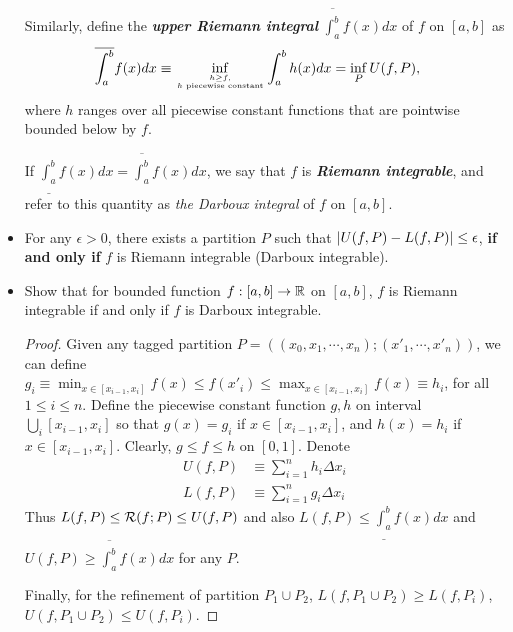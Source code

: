 \documentclass[11pt]{article}
\begin{document}
\begin{itemize}
\begin{definition}
Similarly, define the \emph{\textbf{upper Riemann integral}} $\overline{\int_{a}^{b}}f(x)dx$ of $f$ on $[a, b]$ as
\begin{align*}
\overline{\int_{a}^{b}}f(x)dx &\equiv \inf\limits_{h\ge f, \atop h \text{ piecewise constant}}\int_{a}^{b}h(x)dx = \inf_{P}U(f,P),
\end{align*}
where $h$ ranges over all piecewise constant functions that are pointwise bounded below by $f$.

If $\underline{\int_{a}^{b}}f(x)dx = \overline{\int_{a}^{b}}f(x)dx$, we say that $f$ is \emph{\textbf{Riemann integrable}}, and refer to this quantity as \emph{the Darboux integral} of $f$ on $[a, b]$.
\end{definition}

\item \begin{theorem}
 For any $\epsilon>0$, there exists a partition $P$ such that $\left\lvert U(f,P) - L(f,P)  \right\rvert \le \epsilon $, \textbf{if and only if} $f$ is Riemann integrable (Darboux integrable).
\end{theorem}

\item \begin{exercise}
 Show that for bounded function  $f: [a,b] \rightarrow {\mathbb R}$  on $[a,b]$, $f$ is Riemann integrable if and only if $f$ is Darboux integrable. 
 \end{exercise}
 \begin{proof} 
 Given any  tagged partition $P=  ((x_{0}, x_{1}, \cdots, x_{n}); (x'_{1}, \cdots, x'_{n}))$, we can define $g_{i}\equiv \min_{x\in [x_{i-1}, x_{i}]}f(x) \le f(x'_{i})\le \max_{x\in [x_{i-1}, x_{i}]}f(x)\equiv h_{i}$, for all $1\le i\le n$. Define the piecewise constant function $g, h$ on interval $\bigcup_{i}[x_{i-1}, x_{i}]$ so that $g(x) = g_{i}$ if $x\in  [x_{i-1}, x_{i}]$, and $h(x) = h_{i}$ if $x\in  [x_{i-1}, x_{i}]$. Clearly, $g \le f \le h$ on $[0,1]$. Denote
 \begin{align*}
 U(f,P)&\equiv \sum_{i=1}^{n}h_{i}\Delta x_{i} \\
 L(f,P)&\equiv \sum_{i=1}^{n}g_{i}\Delta x_{i}
 \end{align*}
 Thus $L(f,P)\le {\mathcal R}(f ; P) \le U(f,P)$ and also $L(f,P)\le  \underline{\int_{a}^{b}}f(x)dx$ and $U(f,P)\ge \overline{\int_{a}^{b}}f(x)dx$ for any $P$.  
 
  Finally, for the refinement of partition $P_{1}\cup P_{2}$, $L(f, P_{1}\cup P_{2})\ge L(f,P_{i}) $, $U(f, P_{1}\cup P_{2})\le U(f,P_{i})$.


\end{proof}
\end{itemize}
\end{document}
